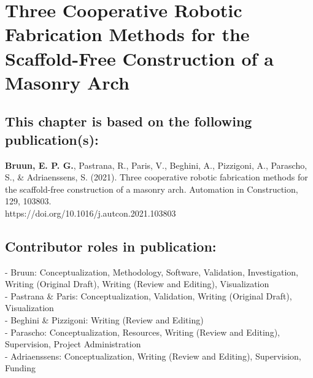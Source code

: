 
\graphicspath{{./\figurefolder/4LightVault/}}

\chapter{Three Cooperative Robotic Fabrication Methods for the Scaffold-Free Construction of a Masonry Arch} \label{chap:4_LightVault}

\thispagestyle{empty}

\vfill 
\section*{\normalsize\textmd{This chapter is based on the following publication(s):}}
    \vspace{-0.3cm}
    \textbf{Bruun, E. P. G.}, Pastrana, R., Paris, V., Beghini, A., Pizzigoni, A., Parascho, S., \& Adriaenssens, S. (2021). Three cooperative robotic fabrication methods for the scaffold-free construction of a masonry arch. Automation in Construction, 129, 103803. \\ https://doi.org/10.1016/j.autcon.2021.103803


\section*{\normalsize\textmd{Contributor roles in publication:}}
    \vspace{-0.3cm}\noindent
    - Bruun: Conceptualization, Methodology, Software, Validation, Investigation, Writing (Original Draft), Writing (Review and Editing), Visualization\\
    - Pastrana \& Paris: Conceptualization, Validation, Writing (Original Draft), Visualization \\
    - Beghini \& Pizzigoni: Writing (Review and Editing) \\
    - Parascho: Conceptualization, Resources, Writing (Review and Editing), Supervision, Project Administration\\
    - Adriaenssens:  Conceptualization, Writing (Review and Editing), Supervision, Funding\\


